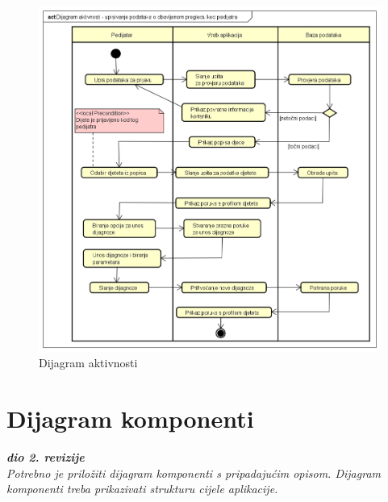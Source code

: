 			 \begin{figure}[H]
			 	\includegraphics[width=\textwidth]{dijagrami/Dijagram aktivnosti.PNG} %
			 	\caption{Dijagram aktivnosti}
			 	\label{fig:dijagramaktivnosti} %
			 \end{figure}
			
			\eject
		\section{Dijagram komponenti}
		
			\textbf{\textit{dio 2. revizije}}\\
		
			 \textit{Potrebno je priložiti dijagram komponenti s pripadajućim opisom. Dijagram komponenti treba prikazivati strukturu cijele aplikacije.}